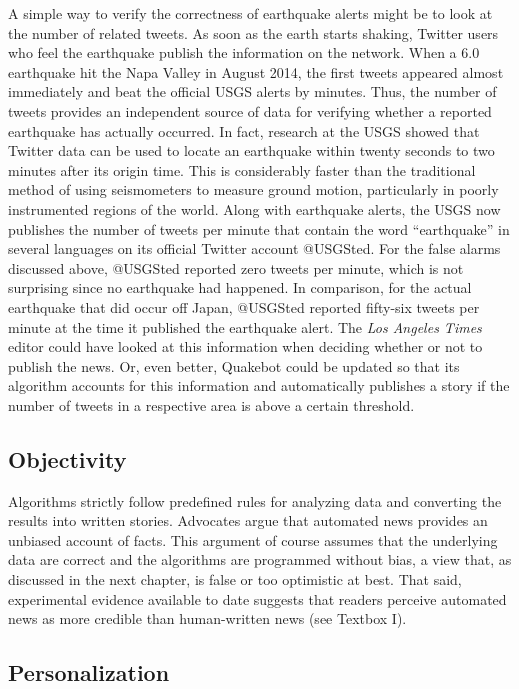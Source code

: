 \documentclass[notoc, symmetric, nobib, nols]{towcenter-guideto-book}
\begin{document}
\begin{framed}
A simple way to verify the correctness of earthquake alerts might be to look at the number of related tweets. As soon as the earth starts shaking, Twitter users who feel the earthquake publish the information on the network. When a 6.0 earthquake hit the Napa Valley in August 2014, the first tweets appeared almost immediately and beat the official USGS alerts by minutes. Thus, the number of tweets provides an independent source of data for verifying whether a reported earthquake has actually occurred. In fact, research at the USGS showed that Twitter data can be used to locate an earthquake within twenty seconds to two minutes after its origin time. This is considerably faster than the traditional method of using seismometers to measure ground motion, particularly in poorly instrumented regions of the world.\autocite{earle11} Along with earthquake alerts, the USGS now publishes the number of tweets per minute that contain the word ``earthquake'' in several languages on its official Twitter account @USGSted. For the false alarms discussed above, @USGSted reported zero tweets per minute, which is not surprising since no earthquake had happened. In comparison, for the actual earthquake that did occur off Japan, @USGSted reported fifty-six tweets per minute at the time it published the earthquake alert. The \textit{Los Angeles Times} editor could have looked at this information when deciding whether or not to publish the news. Or, even better, Quakebot could be updated so that its algorithm accounts for this information and automatically publishes a story if the number of tweets in a respective area is above a certain threshold.
\end{framed}

\subsection{Objectivity}

Algorithms strictly follow predefined rules for analyzing data and converting the results into written stories. Advocates argue that automated news provides an unbiased account of facts. This argument of course assumes that the underlying data are correct and the algorithms are programmed without bias, a view that, as discussed in the next chapter, is false or too optimistic at best.\autocite{lazer14} That said, experimental evidence available to date suggests that readers perceive automated news as more credible than human-written news (see Textbox I).

\subsection{Personalization}
\end{document}
